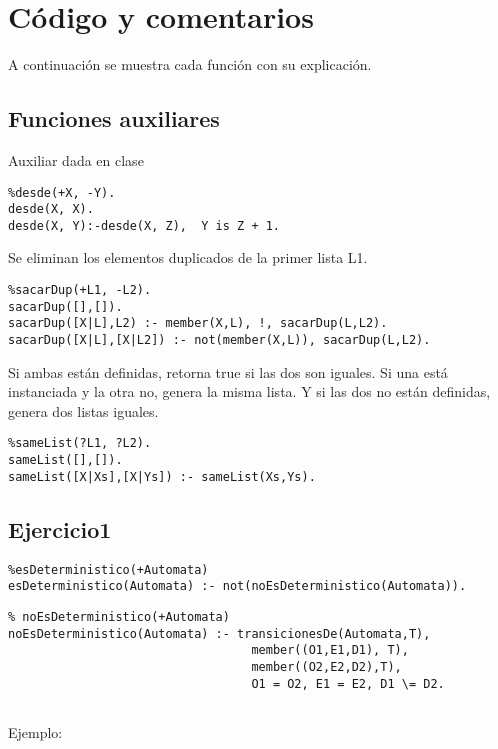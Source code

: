 \documentclass[10pt, a4paper,english,spanish,hidelinks]{article}
\begin{document}
\pagestyle{myheadings}
\maketitle
{}

\thispagestyle{empty}
\tableofcontents
\newpage
\section{Código y comentarios}
A continuación se muestra cada función con su explicación.

\subsection{Funciones auxiliares}

Auxiliar dada en clase
\begin{verbatim}
%desde(+X, -Y).
desde(X, X).
desde(X, Y):-desde(X, Z),  Y is Z + 1.
\end{verbatim}


Se eliminan los elementos duplicados de la primer lista L1.
\begin{verbatim}
%sacarDup(+L1, -L2).
sacarDup([],[]).
sacarDup([X|L],L2) :- member(X,L), !, sacarDup(L,L2).
sacarDup([X|L],[X|L2]) :- not(member(X,L)), sacarDup(L,L2).
\end{verbatim}

Si ambas están definidas, retorna true si las dos son iguales.
Si una está instanciada y la otra no, genera la misma lista.
Y si las dos no están definidas, genera dos listas iguales.

\begin{verbatim}
%sameList(?L1, ?L2).
sameList([],[]).
sameList([X|Xs],[X|Ys]) :- sameList(Xs,Ys).
\end{verbatim}

\subsection{Ejercicio1}

\begin{verbatim}
%esDeterministico(+Automata)
esDeterministico(Automata) :- not(noEsDeterministico(Automata)).
\end{verbatim}

\begin{verbatim}
% noEsDeterministico(+Automata)
noEsDeterministico(Automata) :- transicionesDe(Automata,T),
								  member((O1,E1,D1), T),
								  member((O2,E2,D2),T),
								  O1 = O2, E1 = E2, D1 \= D2.


\end{verbatim}
Ejemplo:
\end{document}
